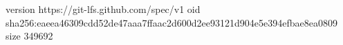 version https://git-lfs.github.com/spec/v1
oid sha256:eaeea46309cdd52de47aaa7ffaac2d600d2ee93121d904e5e394efbae8ea0809
size 349692
